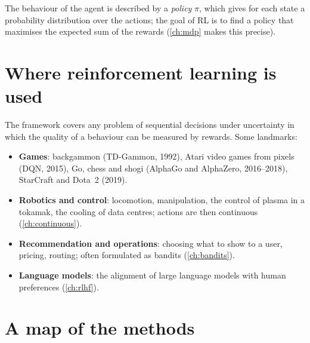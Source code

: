 The behaviour of the agent is described by a \emph{policy} $\pi$, which gives
for each state a probability distribution over the actions; the goal of RL
is to find a policy that maximises the expected sum of the rewards
(\cref{ch:mdp} makes this precise).

\section{Where reinforcement learning is used}

The framework covers any problem of sequential decisions under
uncertainty in which the quality of a behaviour can be measured by
rewards. Some landmarks:
\begin{itemize}[nosep]
  \item \textbf{Games}: backgammon (TD-Gammon, 1992), Atari video games from
    pixels (DQN, 2015), Go, chess and shogi (AlphaGo and AlphaZero,
    2016--2018), StarCraft and Dota~2 (2019).
  \item \textbf{Robotics and control}: locomotion, manipulation, the control
    of plasma in a tokamak, the cooling of data centres; actions are then
    continuous (\cref{ch:continuous}).
  \item \textbf{Recommendation and operations}: choosing what to show to a
    user, pricing, routing; often formulated as bandits (\cref{ch:bandits}).
  \item \textbf{Language models}: the alignment of large language models
    with human preferences (\cref{ch:rlhf}).
\end{itemize}

\section{A map of the methods}
\label{sec:map}


